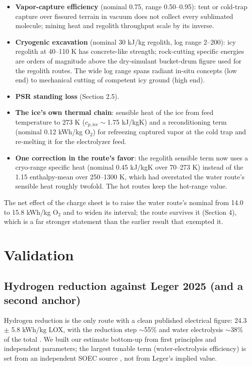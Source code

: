 \documentclass[11pt,a4paper]{article}
\begin{document}
\begin{itemize}
  \item \textbf{Vapor-capture efficiency} (nominal 0.75, range 0.50--0.95): tent or
    cold-trap capture over fissured terrain in vacuum does not collect every sublimated
    molecule; mining heat and regolith throughput scale by its inverse.
  \item \textbf{Cryogenic excavation} (nominal 30 kJ/kg regolith, log range 2--200): icy
    regolith at 40--110 K has concrete-like strength; rock-cutting specific energies are
    orders of magnitude above the dry-simulant bucket-drum figure used for the regolith
    routes. The wide log range spans radiant in-situ concepts (low end) to mechanical
    cutting of competent icy ground (high end).
  \item \textbf{PSR standing loss} (Section 2.5).
  \item \textbf{The ice's own thermal chain}: sensible heat of the ice from feed
    temperature to 273 K ($c_{p,\mathrm{ice}}\sim$1.75 kJ/kgK) and a reconditioning term
    (nominal 0.12 kWh/kg O$_2$) for refreezing captured vapor at the cold trap and
    re-melting it for the electrolyzer feed.
  \item \textbf{One correction in the route's favor}: the regolith sensible term now uses
    a cryo-range specific heat (nominal 0.45 kJ/kgK over 70--273 K) instead of the 1.15
    enthalpy-mean over 250--1300 K, which had overstated the water route's sensible heat
    roughly twofold. The hot routes keep the hot-range value.
\end{itemize}

The net effect of the charge sheet is to raise the water route's nominal from 14.0 to
15.8 kWh/kg O$_2$ and to widen its interval; the route survives it (Section 4), which is a
far stronger statement than the earlier result that exempted it.

\section{Validation}

\subsection{Hydrogen reduction against Leger 2025 (and a second anchor)}

Hydrogen reduction is the only route with a clean published electrical figure: 24.3
$\pm$ 5.8 kWh/kg LOX, with the reduction step $\sim$55\% and water electrolysis
$\sim$38\% of the total \citep{leger2025}. We built our estimate bottom-up from first
principles and independent parameters; the largest tunable term (water-electrolysis
efficiency) is set from an independent SOEC source \citep{hauch2020,iea2019hydrogen},
not from Leger's implied value.
\end{document}
